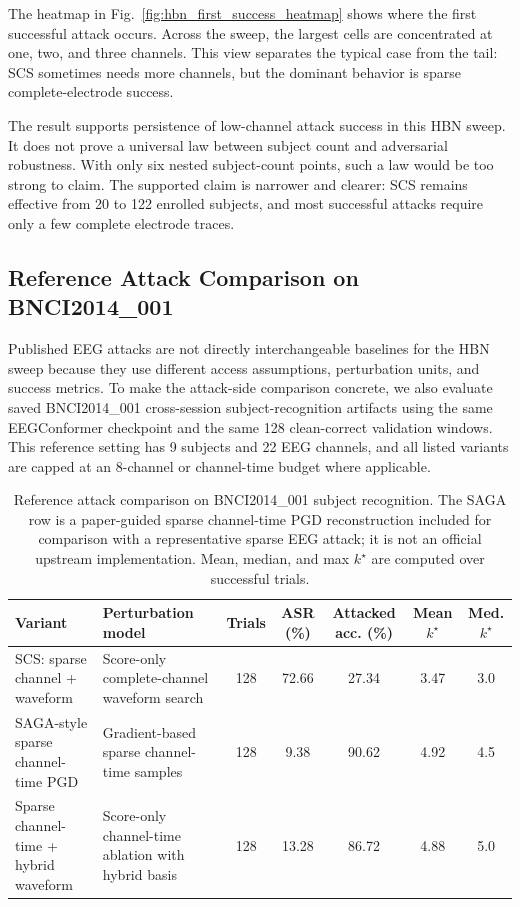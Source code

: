 \documentclass[journal]{IEEEtran}
\begin{document}
The heatmap in Fig.~\ref{fig:hbn_first_success_heatmap} shows where the first successful attack occurs. Across the sweep, the largest cells are concentrated at one, two, and three channels. This view separates the typical case from the tail: SCS sometimes needs more channels, but the dominant behavior is sparse complete-electrode success.

The result supports persistence of low-channel attack success in this HBN sweep. It does not prove a universal law between subject count and adversarial robustness. With only six nested subject-count points, such a law would be too strong to claim. The supported claim is narrower and clearer: SCS remains effective from 20 to 122 enrolled subjects, and most successful attacks require only a few complete electrode traces.

\subsection{Reference Attack Comparison on BNCI2014\_001}

Published EEG attacks are not directly interchangeable baselines for the HBN sweep because they use different access assumptions, perturbation units, and success metrics. To make the attack-side comparison concrete, we also evaluate saved BNCI2014\_001 cross-session subject-recognition artifacts using the same EEGConformer checkpoint and the same 128 clean-correct validation windows. This reference setting has 9 subjects and 22 EEG channels, and all listed variants are capped at an 8-channel or channel-time budget where applicable.

\begin{table}[t]
\centering
\caption{Reference attack comparison on BNCI2014\_001 subject recognition. The SAGA row is a paper-guided sparse channel-time PGD reconstruction included for comparison with a representative sparse EEG attack; it is not an official upstream implementation. Mean, median, and max $k^\star$ are computed over successful trials.}
\label{tab:bnci_attack_comparison}
\scriptsize
\begin{tabular}{p{}p{}ccccc}
\hline
Variant & Perturbation model & Trials & ASR (\%) & Attacked acc. (\%) & Mean $k^\star$ & Med. $k^\star$ \\
\hline
SCS: sparse channel + waveform & Score-only complete-channel waveform search & 128 & 72.66 & 27.34 & 3.47 & 3.0 \\
SAGA-style sparse channel-time PGD & Gradient-based sparse channel-time samples & 128 & 9.38 & 90.62 & 4.92 & 4.5 \\
Sparse channel-time + hybrid waveform & Score-only channel-time ablation with hybrid basis & 128 & 13.28 & 86.72 & 4.88 & 5.0 \\
\hline
\end{tabular}
\end{table}
\end{document}
